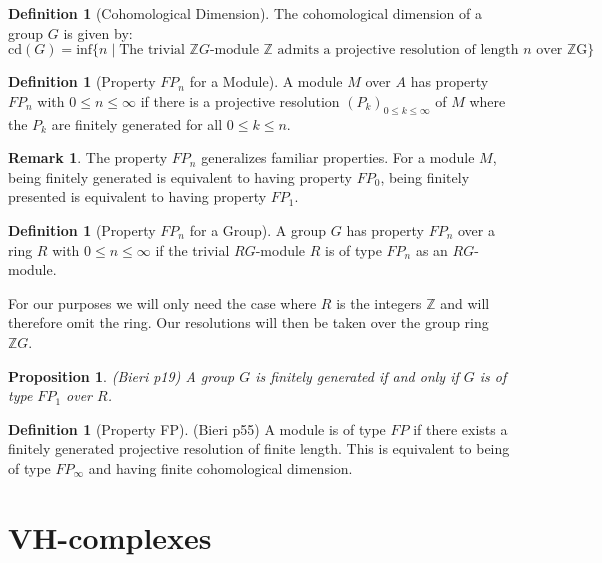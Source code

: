 \documentclass[12pt,parskip=full]{report}
\theoremstyle{plain}
\newtheorem{prop}[thm]{Proposition}
\theoremstyle{definition}
\newtheorem{rmk}[thm]{Remark}
\newtheorem{dfn}[thm]{Definition}
\begin{document}
\begin{dfn}
[Cohomological Dimension]
The cohomological dimension of a group \(G\) is given by:
\[
    \text{cd}(G) = \text{inf}\{n\mid\text{The trivial }\mathbb{Z}G\text{-module }\mathbb{Z}\text{ admits a projective resolution of length \(n\) over \(\mathbb{Z}\)G}\}
\]
\end{dfn}

\begin{dfn}
[Property \(FP_n\) for a Module]

A module \(M\) over \(A\) has property \(FP_n\) with \(0\leq n\leq \infty\) if there is a projective resolution \((P_k)_{0\leq k\leq \infty}\) of \(M\) where the \(P_k\) are finitely generated for all \(0\leq k\leq n\).
\end{dfn}

\begin{rmk}
The property \(FP_n\) generalizes familiar properties. For a module \(M\), being finitely generated is equivalent to having property \(FP_0\), being finitely presented is equivalent to having property \(FP_1\).
\end{rmk}

\begin{dfn}
[Property \(FP_n\) for a Group]

A group \(G\) has property \(FP_n\) over a ring \(R\) with \(0\leq n\leq \infty\) if the trivial \(RG\)-module \(R\) is of type \(FP_n\) as an \(RG\)-module.
\end{dfn}

For our purposes we will only need the case where \(R\) is the integers \(\mathbb{Z}\) and will therefore omit the ring. Our resolutions will then be taken over the group ring \(\mathbb{Z}G\).

\begin{prop}
(Bieri p19)
A group \(G\) is finitely generated if and only if \(G\) is of type \(FP_1\) over \(R\).
\end{prop}

\begin{dfn}
[Property FP]
(Bieri p55)
A module is of type \(FP\) if there exists a finitely generated projective resolution of finite length. This is equivalent to being of type \(FP_\infty\) and having finite cohomological dimension.
\end{dfn}

\section{VH-complexes}
\end{document}
